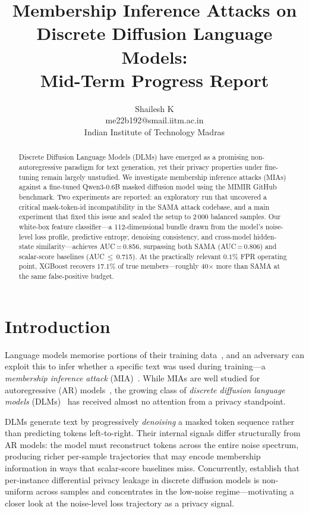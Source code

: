 \documentclass{article}
\title{Membership Inference Attacks on Discrete Diffusion Language Models:\\
Mid-Term Progress Report}
\author{%
  Shailesh K \\
  me22b192@smail.iitm.ac.in \\
  Indian Institute of Technology Madras
}
\begin{document}
\maketitle

\begin{abstract}
Discrete Diffusion Language Models (DLMs) have emerged as a promising
non-autoregressive paradigm for text generation, yet their privacy properties
under fine-tuning remain largely unstudied.
We investigate membership inference attacks (MIAs) against a fine-tuned
Qwen3-0.6B masked diffusion model using the MIMIR GitHub benchmark.
Two experiments are reported: an exploratory run that uncovered a
critical mask-token-id incompatibility in the SAMA attack codebase, and a
main experiment that fixed this issue and scaled the setup to 2\,000
balanced samples.
Our white-box feature classifier---a 112-dimensional bundle drawn from the
model's noise-level loss profile, predictive entropy, denoising consistency,
and cross-model hidden-state similarity---achieves AUC\,=\,0.856, surpassing
both SAMA (AUC\,=\,0.806) and scalar-score baselines (AUC\,$\leq$\,0.715).
At the practically relevant $0.1\%$ FPR operating point, XGBoost recovers
$17.1\%$ of true members---roughly 40$\times$ more than SAMA at the same
false-positive budget.
\end{abstract}

\section{Introduction}
\label{sec:intro}

Language models memorise portions of their training data~\citep{carlini2021extracting},
and an adversary can exploit this to infer whether a specific text was used during
training---a \emph{membership inference attack} (MIA)~\citep{shokri2017membership}.
While MIAs are well studied for autoregressive (AR)
models~\citep{carlini2022membership,mattern2023membership}, the growing class of
\emph{discrete diffusion language models}
(DLMs)~\citep{austin2021d3pm,sahoo2024mdlm,louSEDD2024,nieLLaDA2025}
has received almost no attention from a privacy standpoint.

DLMs generate text by progressively \emph{denoising} a masked token sequence
rather than predicting tokens left-to-right.
Their internal signals differ structurally from AR models: the model must
reconstruct tokens across the entire noise spectrum, producing richer
per-sample trajectories that may encode membership information in ways
that scalar-score baselines miss.
Concurrently, \citet{wei2023pdp} establish that per-instance differential privacy
leakage in discrete diffusion models is non-uniform across samples and
concentrates in the low-noise regime---motivating a closer look at the
noise-level loss trajectory as a privacy signal.
\end{document}
